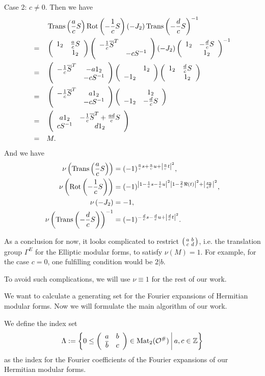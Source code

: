 \begin{remark}
Case 2: $c\neq 0$. Then we have
\begin{align*}
& \operatorname{Trans}\left(\frac{a}{c}S\right) \operatorname{Rot}\left(-\frac{1}{c}S\right) (-J_2) \operatorname{Trans}\left(-\frac{d}{c}S\right)^{-1} \\
=\quad & \left( \begin{array}{cc} 1_2 & \frac{a}{c}S \\  & 1_2 \end{array} \right)
\left( \begin{array}{cc} -\frac{1}{c}\overline{S}^T &  \\  & -cS^{-1} \end{array} \right)
(-J_2)
\left( \begin{array}{cc} 1_2 & -\frac{d}{c}S \\  & 1_2 \end{array} \right)^{-1} \\
=\quad &
\left( \begin{array}{cc} -\frac{1}{c}\overline{S}^T & -a 1_2 \\  & -cS^{-1} \end{array} \right)
\left( \begin{array}{cc}  & 1_2 \\ -1_2 &  \end{array} \right)
\left( \begin{array}{cc} 1_2 & \frac{d}{c}S \\  & 1_2 \end{array} \right) \\
=\quad &
\left( \begin{array}{cc} -\frac{1}{c}\overline{S}^T & a 1_2 \\  & -cS^{-1} \end{array} \right)
\left( \begin{array}{cc}  & 1_2 \\ -1_2 & -\frac{d}{c}S \end{array} \right) \\
=\quad &
\left( \begin{array}{cc} a 1_2 & -\frac{1}{c}\overline{S}^T + \frac{ad}{c}S \\ cS^{-1} & d 1_2 \end{array} \right) \\
=\quad &
M.
\end{align*}
And we have
\begin{align*}
\nu\left( \operatorname{Trans}\left(\frac{a}{c}S \right) \right) & = (-1)^{\frac{a}{c}s + \frac{a}{c}u + \left|\frac{a}{c} t \right|^2} , \\
\nu\left( \operatorname{Rot}\left(-\frac{1}{c}S \right) \right) & = (-1)^{\left|1-\frac{1}{c}s -\frac{1}{c}u\right|^2 \left|1 - \frac{2}{c}\Re(t) \right|^2 + \left| \frac{su}{c^2} \right|^2 } , \\
\nu\left( -J_2 \right) & = -1 , \\
\nu\left( \operatorname{Trans}\left(-\frac{d}{c}S \right) \right)^{-1} & = (-1)^{-\frac{d}{c}s - \frac{d}{c}u + \left|\frac{d}{c} t \right|^2} . \\
\end{align*}

As a conclusion for now, it looks complicated to restrict $\left( \begin{smallmatrix} a & b \\ c & d \end{smallmatrix} \right)$, i.e. the translation group $\Gamma^E$ for the Elliptic modular forms, to satisfy $\nu(M)=1$. For example, for the case $c=0$, one fulfilling condition would be $2 | b$.

To avoid such complications, we will use $\nu \equiv 1$ for the rest of our work.\endproof
\end{remark}



We want to calculate a generating set for the Fourier expansions of Hermitian modular forms. Now we will formulate the main algorithm of our work.

We define the index set
\[ \Lambda := \Set{0 \le \SimpleMatrix{a}{b}{\overline b}{c} \in \M_2(\curlO^\#)}{a,c \in \Z } \]
as the index for the Fourier coefficients of the Fourier expansions of our Hermitian modular forms.

